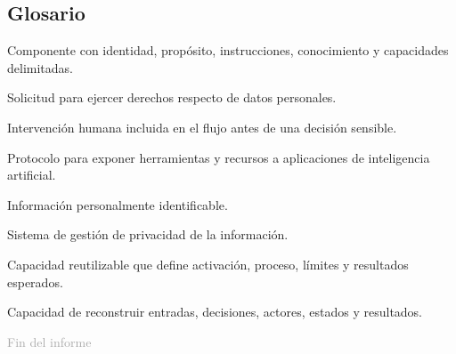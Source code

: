 \documentclass[11pt,a4paper]{article}
\begin{document}
\subsection{Glosario}

\begin{description}[style=nextline,leftmargin=3.8cm]
  \item[Agente] Componente con identidad, propósito, instrucciones, conocimiento y capacidades delimitadas.
  \item[DSAR] Solicitud para ejercer derechos respecto de datos personales.
  \item[HITL] Intervención humana incluida en el flujo antes de una decisión sensible.
  \item[MCP] Protocolo para exponer herramientas y recursos a aplicaciones de inteligencia artificial.
  \item[PII] Información personalmente identificable.
  \item[PIMS] Sistema de gestión de privacidad de la información.
  \item[Skill] Capacidad reutilizable que define activación, proceso, límites y resultados esperados.
  \item[Trazabilidad] Capacidad de reconstruir entradas, decisiones, actores, estados y resultados.
\end{description}

\vfill
\begin{center}
\textcolor{darkGray}{\small Fin del informe}
\end{center}
\end{document}
